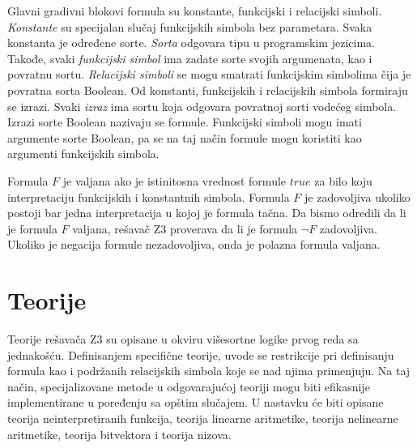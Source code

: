 \documentclass[12pt,oneside]{memoir}
\begin{document}
Glavni gradivni blokovi formula su konstante, funkcijski i relacijski simboli. \emph{Konstante} su specijalan slučaj funkcijskih simbola bez parametara. Svaka konstanta je određene sorte. \emph{Sorta} odgovara tipu u programskim jezicima. Takođe, svaki \emph{funkcijski simbol} ima zadate sorte svojih argumenata, kao i povratnu sortu. \emph{Relacijski simboli} se mogu smatrati funkcijskim simbolima čija je povratna sorta Boolean. Od konstanti, funkcijskih i relacijskih simbola formiraju se izrazi. Svaki \emph{izraz} ima sortu koja odgovara povratnoj sorti vodećeg simbola. Izrazi sorte Boolean nazivaju se formule. Funkcijski simboli mogu imati argumente sorte Boolean, pa se na taj način formule mogu koristiti kao argumenti funkcijskih simbola.


Formula $F$ je valjana ako je istinitosna vrednost formule 
$true$ za bilo koju interpretaciju funkcijskih i konstantnih simbola. Formula $F$ je zadovoljiva ukoliko postoji bar jedna interpretacija u kojoj je formula tačna. Da bismo odredili da li je formula $F$ valjana, rešavač Z3 proverava da li je formula $\lnot F$ zadovoljiva. Ukoliko je negacija formule nezadovoljiva, onda je polazna formula valjana. 



\section{Teorije} \label{sec:num2}
Teorije rešavača Z3 su opisane u okviru višesortne logike prvog reda sa jednakošću.  Definisanjem specifične teorije, uvode se restrikcije pri definisanju formula kao i podržanih relacijskih simbola koje se nad njima primenjuju. Na taj način, specijalizovane metode u odgovarajućoj teoriji mogu biti efikasnije implementirane u poređenju sa opštim slučajem. U nastavku će biti opisane teorija neinterpretiranih funkcija, teorija linearne aritmetike, teorija nelinearne aritmetike, teorija bitvektora i teorija nizova.
\end{document}
